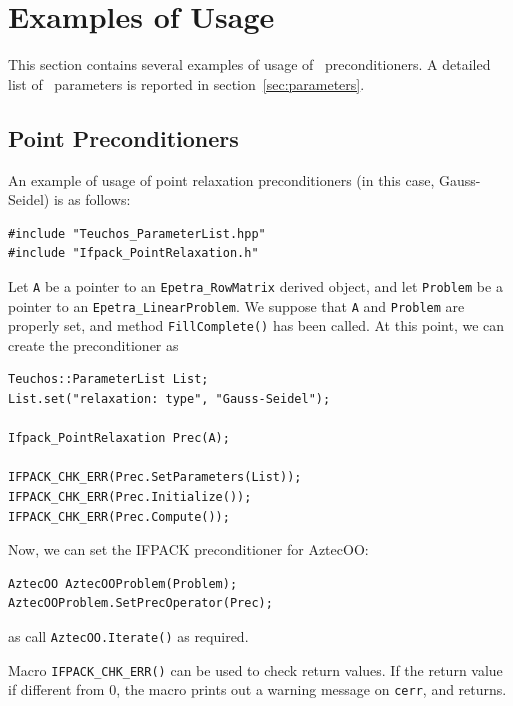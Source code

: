 {%
\section{Examples of Usage}
\label{sec:usage}

This section contains several examples of usage of \ifpack\ preconditioners. A
detailed list of \ifpack\ parameters is reported in
section~\ref{sec:parameters}.

\subsection{Point Preconditioners}
\label{sec:point_ex}

An example of usage of point relaxation preconditioners (in this case, Gauss-Seidel) is as
follows:
\begin{verbatim}
#include "Teuchos_ParameterList.hpp"
#include "Ifpack_PointRelaxation.h"
\end{verbatim}
Let \verb!A! be a pointer to an \verb!Epetra_RowMatrix! derived object,
  and let \verb!Problem! be a pointer to an \verb!Epetra_LinearProblem!.
We suppose that \verb!A! and 
\verb!Problem! are properly set, and
method \verb~FillComplete()~ has been called. At this point, we can create the
preconditioner as
\begin{verbatim}
Teuchos::ParameterList List;
List.set("relaxation: type", "Gauss-Seidel");

Ifpack_PointRelaxation Prec(A);

IFPACK_CHK_ERR(Prec.SetParameters(List));
IFPACK_CHK_ERR(Prec.Initialize());
IFPACK_CHK_ERR(Prec.Compute());
\end{verbatim}
Now, we can set the IFPACK preconditioner for AztecOO:
\begin{verbatim}
AztecOO AztecOOProblem(Problem);
AztecOOProblem.SetPrecOperator(Prec);
\end{verbatim}
as call \verb!AztecOO.Iterate()! as required.

Macro \verb!IFPACK_CHK_ERR()! can be used to check return values. If the
return value if different from 0, the macro prints out a warning message on
\verb!cerr!, and returns.

}
